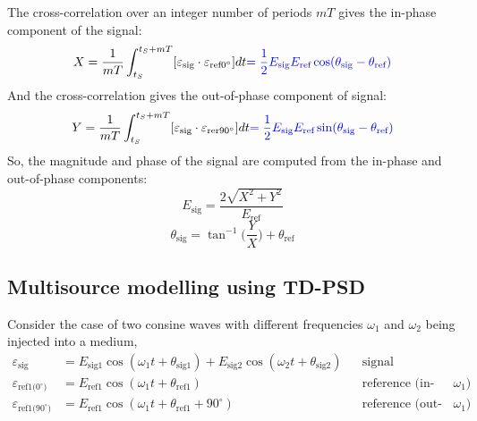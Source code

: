 The cross-correlation over an integer number of periods $mT$ gives
the in-phase component of the signal:
\[ X = \frac{1}{mT} \int_{t_S}^{t_S + mT} [ \varepsilon_\text{sig} \cdot
  \varepsilon_{\text{ref0}^\circ} ] dt {\color{blue} = \frac{1}{2} E_\text{sig}
  E_\text{ref} \cos(\theta_\text{sig} - \theta_\text{ref}) } \]
And the cross-correlation gives the out-of-phase component of signal:
\[ Y = \frac{1}{mT} \int_{t_S}^{t_S + mT} [ \varepsilon_\text{sig} \cdot
  \varepsilon_{\text{rer90}^\circ} ] dt {\color{blue} = \frac{1}{2} E_\text{sig}
  E_\text{ref} \sin(\theta_\text{sig} - \theta_\text{ref}) } \]
So, the magnitude and phase of the signal are computed from the in-phase
and out-of-phase components:
\[ E_\text{sig} = \frac{2 \sqrt{X^2 + Y^2}}{E_\text{ref}} \]
\[ \theta_\text{sig} = \tan^{-1} \Big( \frac{Y}{X} \Big) + \theta_\text{ref} \]

\subsection{Multisource modelling using TD-PSD}
Consider the case of two consine waves with different frequencies $\omega_1$ and
$\omega_2$ being injected into a medium,
\begin{align*}
  \varepsilon_\text{sig} & = E_\text{sig1} \cos(\omega_1 t + \theta_\text{sig1})
    + E_\text{sig2} \cos(\omega_2 t + \theta_\text{sig2}) & & \text{signal} \\
  \varepsilon_\text{ref1($0^\circ$)} & = E_\text{ref1} \cos(\omega_1 t
    + \theta_\text{ref1}) & & \text{reference (in-phase $\omega_1$)} \\
  \varepsilon_\text{ref1($90^\circ$)} & = E_\text{ref1} \cos(\omega_1 t
    + \theta_\text{ref1} + 90^\circ)
    & & \text{reference (out-of-phase $\omega_1$)}
\end{align*}


